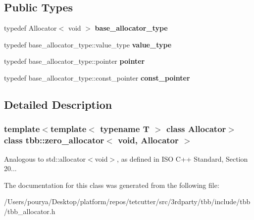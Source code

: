 \subsection*{Public Types}
\begin{DoxyCompactItemize}
\item 
\hypertarget{classtbb_1_1zero__allocator_3_01void_00_01Allocator_01_4_ad760fbbdefc95c096c94521316e9e091}{}typedef Allocator$<$ void $>$ {\bfseries base\+\_\+allocator\+\_\+type}\label{classtbb_1_1zero__allocator_3_01void_00_01Allocator_01_4_ad760fbbdefc95c096c94521316e9e091}

\item 
\hypertarget{classtbb_1_1zero__allocator_3_01void_00_01Allocator_01_4_a392c9d2f51594e7372e5e73e4bf805ff}{}typedef base\+\_\+allocator\+\_\+type\+::value\+\_\+type {\bfseries value\+\_\+type}\label{classtbb_1_1zero__allocator_3_01void_00_01Allocator_01_4_a392c9d2f51594e7372e5e73e4bf805ff}

\item 
\hypertarget{classtbb_1_1zero__allocator_3_01void_00_01Allocator_01_4_aa6c02215a540d3f5dd4cb4739bd05bcf}{}typedef base\+\_\+allocator\+\_\+type\+::pointer {\bfseries pointer}\label{classtbb_1_1zero__allocator_3_01void_00_01Allocator_01_4_aa6c02215a540d3f5dd4cb4739bd05bcf}

\item 
\hypertarget{classtbb_1_1zero__allocator_3_01void_00_01Allocator_01_4_a0f2fa4e1a995d60f763595ef4b91dd9a}{}typedef base\+\_\+allocator\+\_\+type\+::const\+\_\+pointer {\bfseries const\+\_\+pointer}\label{classtbb_1_1zero__allocator_3_01void_00_01Allocator_01_4_a0f2fa4e1a995d60f763595ef4b91dd9a}

\end{DoxyCompactItemize}


\subsection{Detailed Description}
\subsubsection*{template$<$template$<$ typename T $>$ class Allocator$>$class tbb\+::zero\+\_\+allocator$<$ void, Allocator $>$}

Analogous to std\+::allocator$<$void$>$, as defined in I\+S\+O C++ Standard, Section 20... 



The documentation for this class was generated from the following file\+:\begin{DoxyCompactItemize}
\item 
/\+Users/pourya/\+Desktop/platform/repos/tetcutter/src/3rdparty/tbb/include/tbb/tbb\+\_\+allocator.\+h\end{DoxyCompactItemize}
